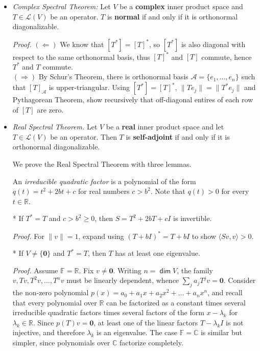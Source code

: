 \documentclass[11pt]{article}
\newcommand{\1}{\mathbf{1}}
\newcommand{\inner}[2]{\langle #1, #2 \rangle}
\newcommand{\0}{\mathbf{0}}
\newcommand{\A}{\mathcal{A}}
\newcommand{\C}{\mathbb{C}}
\newcommand{\F}{\mathbb{F}}
\newcommand{\R}{\mathbb{R}}
\DeclareMathOperator{\mydim}{\mathsf{dim}}
\renewcommand{\geq}{\geqslant}
\begin{document}
{\begin{itemize}
\item

\emph{Complex Spectral Theorem:} Let $V$ be a \textbf{complex} inner product space and $T\in\mathcal{L}(V)$ be an operator. $T$ is \textbf{normal} if and only if it is orthonormal diagonalizable.


\emph{Proof.}
$(\Leftarrow)$
We know that $[T^*]=[T]^*$, so $[T^*]$ is also diagonal with respect to the same orthonormal basis, thus $[T]^*$ and $[T]$ commute, hence $T^*$ and $T$ commute.
\\
$(\Rightarrow)$
By Schur's Theorem, there is orthonormal basis $\mathcal{A}=\{e_1,\dots,e_n\}$ such that $[T]_\A$ is upper-triangular.
Using $[T^*]=[T]^*$, $\|T e_j \|=\|T^* e_j \|$ and Pythagorean Theorem, show recursively that off-diagonal entires of each row of $[T]$ are zero.

\item

\emph{Real Spectral Theorem.} Let $V$ be a \textbf{real} inner product space and let $T\in\mathcal{L}(V)$ be an operator.
Then $T$ is \textbf{self-adjoint} if and only if it is orthonormal diagonalizable.


We prove the Real Spectral Theorem with three lemmas.

An \emph{irreducible quadratic factor} is a polynomial of the form $q(t)=t^2 + 2bt + c$ for real numbers $c>b^2$.
Note that $q(t)>0$ for every $t \in \R$.

*
If $T^*=T$ and $c>b^2 \geq 0$, then $S=T^2+2bT+cI$ is invertible.

\emph{Proof.}
For $\|v\|=1$, expand using $(T+bI)^*=T+bI$ to show $\inner{Sv}{v}>0$.

*
If $V\neq\{\0\}$ and $T^*=T$, then $T$ has at least one eigenvalue.

\emph{Proof.}
Assume $\F=\R$.
Fix $v\ne\0$.
Writing $n=\mydim V$, the family $v,Tv,T^2v,\dots,T^nv$ must be linearly dependent, whence $\sum_j 
a_j T^j v = \0$.
Consider the non-zero polynomial $p(x)=a_0 + a_1 x + a_2 x^2 + \dots + a_n x^n$, and recall that every polynomial over $\R$ can be factorized as a constant times several irreducible quadratic factors times several factors of the form $x-\lambda_k$ for $\lambda_k \in \R$.
Since $p(T)v=\0$, at least one of the linear factors $T-\lambda_k I$ is not injective, and therefore $\lambda_k$ is an eigenvalue.
The case $\F=\C$ is similar but simpler, since polynomials over $\C$ factorize completely.


\end{itemize}}
\end{document}
